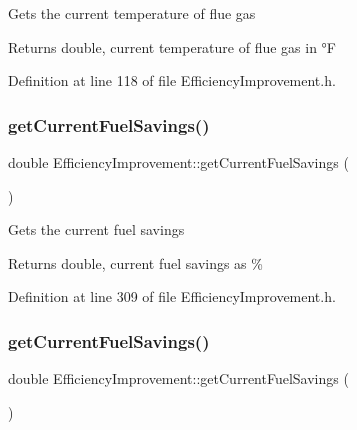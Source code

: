Gets the current temperature of flue gas

\begin{DoxyReturn}{Returns}
double, current temperature of flue gas in °F 
\end{DoxyReturn}


Definition at line 118 of file Efficiency\+Improvement.\+h.

\mbox{\label{class_efficiency_improvement_ab2e940be7192df960c9eb9578096796f}} 
\subsubsection{\texorpdfstring{get\+Current\+Fuel\+Savings()}{getCurrentFuelSavings()}\hspace{0.1cm}{\footnotesize\ttfamily [1/3]}}
{\footnotesize\ttfamily double Efficiency\+Improvement\+::get\+Current\+Fuel\+Savings (\begin{DoxyParamCaption}{ }\end{DoxyParamCaption})\hspace{0.3cm}{\ttfamily [inline]}}

Gets the current fuel savings

\begin{DoxyReturn}{Returns}
double, current fuel savings as \% 
\end{DoxyReturn}


Definition at line 309 of file Efficiency\+Improvement.\+h.

\mbox{\label{class_efficiency_improvement_ab2e940be7192df960c9eb9578096796f}} 
\subsubsection{\texorpdfstring{get\+Current\+Fuel\+Savings()}{getCurrentFuelSavings()}\hspace{0.1cm}{\footnotesize\ttfamily [2/3]}}
{\footnotesize\ttfamily double Efficiency\+Improvement\+::get\+Current\+Fuel\+Savings (\begin{DoxyParamCaption}{ }\end{DoxyParamCaption})\hspace{0.3cm}{\ttfamily [inline]}}

